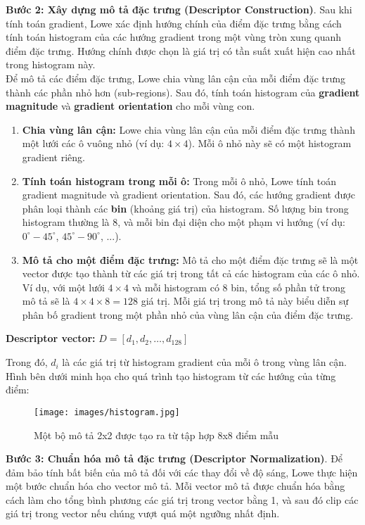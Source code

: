 \textbf{Bước 2: Xây dựng mô tả đặc trưng (Descriptor Construction)}. Sau khi tính toán gradient, Lowe xác định hướng chính của điểm đặc trưng bằng cách tính toán histogram của các hướng gradient trong một vùng tròn xung quanh điểm đặc trưng. Hướng chính được chọn là giá trị có tần suất xuất hiện cao nhất trong histogram này.\\

Để mô tả các điểm đặc trưng, Lowe chia vùng lân cận của mỗi điểm đặc trưng thành các phần nhỏ hơn (sub-regions). Sau đó, tính toán histogram của \textbf{gradient magnitude} và \textbf{gradient orientation} cho mỗi vùng con.

\begin{enumerate}
	\item \textbf{Chia vùng lân cận:} Lowe chia vùng lân cận của mỗi điểm đặc trưng thành một lưới các ô vuông nhỏ (ví dụ: \(4 \times 4\)). Mỗi ô nhỏ này sẽ có một histogram gradient riêng.
	
	\item \textbf{Tính toán histogram trong mỗi ô:} Trong mỗi ô nhỏ, Lowe tính toán gradient magnitude và gradient orientation. Sau đó, các hướng gradient được phân loại thành các \textbf{bin} (khoảng giá trị) của histogram. Số lượng bin trong histogram thường là 8, và mỗi bin đại diện cho một phạm vi hướng (ví dụ: \(0^\circ - 45^\circ\), \(45^\circ - 90^\circ\), ...).
	
	\item \textbf{Mô tả cho một điểm đặc trưng:} Mô tả cho một điểm đặc trưng sẽ là một vector được tạo thành từ các giá trị trong tất cả các histogram của các ô nhỏ. Ví dụ, với một lưới \(4 \times 4\) và mỗi histogram có 8 bin, tổng số phần tử trong mô tả sẽ là \(4 \times 4 \times 8 = 128\) giá trị. Mỗi giá trị trong mô tả này biểu diễn sự phân bố gradient trong một phần nhỏ của vùng lân cận của điểm đặc trưng.
\end{enumerate}

\textbf{Descriptor vector: } \( D = [d_1, d_2, \dots, d_{128}] \)

Trong đó, \( d_i \) là các giá trị từ histogram gradient của mỗi ô trong vùng lân cận. Hình bên dưới minh họa cho quá trình tạo histogram từ các hướng của từng điểm:
\begin{figure}[H]
	\centering
	\texttt{[image: images/histogram.jpg]}
	\caption{Một bộ mô tả 2x2 được tạo ra từ tập hợp 8x8 điểm mẫu}
\end{figure}


\textbf{Bước 3: Chuẩn hóa mô tả đặc trưng (Descriptor Normalization)}. Để đảm bảo tính bất biến của mô tả đối với các thay đổi về độ sáng, Lowe thực hiện một bước chuẩn hóa cho vector mô tả. Mỗi vector mô tả được chuẩn hóa bằng cách làm cho tổng bình phương các giá trị trong vector bằng 1, và sau đó clip các giá trị trong vector nếu chúng vượt quá một ngưỡng nhất định.

